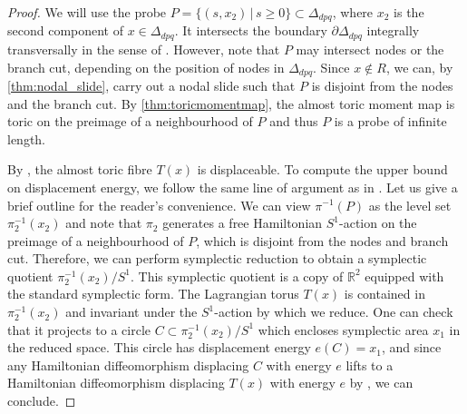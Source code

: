 \documentclass[12pt,a4paper,abstract=true,final]{scrartcl}
\begin{document}
\begin{proof}
We will use the probe $P = \{(s,x_2) \, \vert \, s ≥ 0\} \subset \Delta_{dpq}$, where $x_2$ is the second component of $x \in \Delta_{dpq}$.
It intersects the boundary $∂ \Delta_{dpq}$ integrally transversally in the sense of \cite[Section 2.1]{mcduff2011displacing}.
However, note that $P$ may intersect nodes or the branch cut, depending on the position of nodes in $\Delta_{dpq}$.
Since $x ∉ R$, we can, by \cref{thm:nodal_slide}, carry out a nodal slide such that $P$ is disjoint from the nodes and the branch cut.
By \cref{thm:toricmomentmap}, the almost toric moment map is toric on the preimage of a neighbourhood of $P$ and thus $P$ is a probe of infinite length.

By \cite[Lemma 2.4]{mcduff2011displacing}, the almost toric fibre $T(x)$ is displaceable.
To compute the upper bound on displacement energy, we follow the same line of argument as in \cite[Proposition 3.4]{brendel2020real}.
Let us give a brief outline for the reader's convenience.
We can view $\pi^{-1}(P)$ as the level set $\pi_2^{-1}(x_2)$ and note that $\pi_2$ generates a free Hamiltonian $S^1$-action on the preimage of a neighbourhood of $P$, which is disjoint from the nodes and branch cut.
Therefore, we can perform symplectic reduction to obtain a symplectic quotient $\pi_2^{-1}(x_2)/S^1$.
This symplectic quotient is a copy of $\mathbb{R}^2$ equipped with the standard symplectic form.
The Lagrangian torus $T(x)$ is contained in $\pi_2^{-1}(x_2)$ and invariant under the $S^1$-action by which we reduce.
One can check that it projects to a circle $C \subset \pi_2^{-1}(x_2)/S^1$ which encloses symplectic area $x_1$ in the reduced space.
This circle has displacement energy $e(C) = x_1$, and since any Hamiltonian diffeomorphism displacing $C$ with energy $e$ lifts to a Hamiltonian diffeomorphism displacing $T(x)$ with energy $e$ by \cite[Lemma 3.1]{brendel2020real}, we can conclude.
\end{proof}
\end{document}
